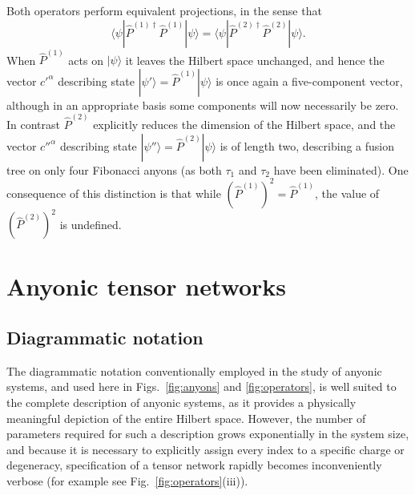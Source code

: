 \documentclass[aps,prb,reprint,superscriptaddress,amsfonts,amsmath,amssymb,showpacs,floatfix]{revtex4-1}
\newcommand{\fref}[1]{Fig.~\ref{#1}}
\newcommand{\ra}{\rangle}
\newcommand{\la}{\langle}
\begin{document}
Both operators perform equivalent projections, in the sense that %
\begin{equation}
\la\psi|\hat P^{(1)\dagger}\hat P^{(1)}|\psi\ra = \la\psi|\hat P^{(2)\dagger}\hat P^{(2)}|\psi\ra.
\end{equation} 
When $\hat P^{(1)}$ acts on $|\psi\ra$ it leaves the Hilbert space unchanged, and hence the vector $c'^\alpha$ describing state $|\psi'\ra=\hat P^{(1)}|\psi\ra$ is once again a five-component vector, although in an appropriate basis some components will now necessarily be zero. In contrast $\hat P^{(2)}$ explicitly reduces the dimension of the Hilbert space, and the vector $c''^\alpha$ describing state $|\psi''\ra=\hat P^{(2)}|\psi\ra$ is of length two, describing a fusion tree on only four Fibonacci anyons (as both $\tau_1$ and $\tau_2$ have been eliminated). One consequence of this distinction is that while $(\hat P^{(1)})^2=\hat P^{(1)}$, the value of $(\hat P^{(2)})^2$ is undefined.

\section{Anyonic tensor networks}

\subsection{Diagrammatic notation\label{sec:tensordiagrammatic}}

The diagrammatic notation conventionally employed in the study of anyonic systems, and used here in Figs.~\ref{fig:anyons} and \ref{fig:operators}, is well suited to the complete description of anyonic systems, as it provides a physically meaningful depiction of the entire Hilbert space. 
However, the number of parameters required for such a description grows exponentially in the system size, and because it is necessary to explicitly assign every index to a specific charge or degeneracy, specification of a tensor network rapidly becomes inconveniently verbose (for example see \fref{fig:operators}(iii)). %
\end{document}
